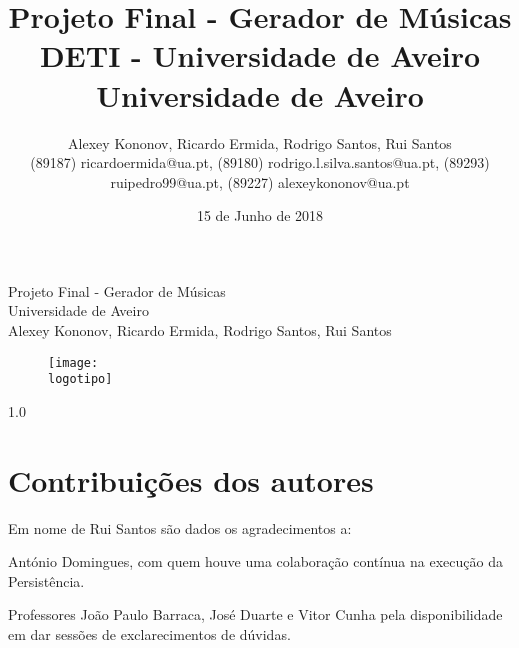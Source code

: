 \documentclass[a4paper]{report}
\begin{document}
%
\def\titulo{Projeto Final - Gerador de Músicas}
\def\data{15 de Junho de 2018}
\def\autores{Alexey Kononov, Ricardo Ermida, Rodrigo Santos, Rui Santos}
\def\autorescontactos{(89187) ricardoermida@ua.pt, (89180) rodrigo.l.silva.santos@ua.pt, (89293) ruipedro99@ua.pt, (89227) alexeykononov@ua.pt}
\def\versao{1.0}
\def\departamento{DETI - Universidade de Aveiro}
\def\empresa{Universidade de Aveiro}
\def\logotipo{ua.pdf}
%
%
\begin{titlepage}

\begin{center}
%
\vspace*{50mm}
%
{\Huge \titulo}\\ 
%
\vspace{10mm}
%
{\Large \empresa}\\
%
\vspace{10mm}
%
{\LARGE \autores}\\ 
%
\vspace{30mm}
%
\begin{figure}[h]
\center
\texttt{[image: \\logotipo]}
\end{figure}
%
\vspace{30mm}
\end{center}
%
\begin{flushright}
\versao
\end{flushright}
\end{titlepage}

\title{%
{\Huge\textbf{\titulo}}\\
{\Large \departamento\\ \empresa}
}
%
\author{%
    \autores \\
    \autorescontactos
}
%
\date{\data}
%
\maketitle



\chapter*{Contribuições dos autores}

Em nome de Rui Santos são dados os agradecimentos a:

António Domingues, com quem houve uma colaboração contínua na execução da Persistência.

Professores João Paulo Barraca, José Duarte e Vitor Cunha pela disponibilidade em dar sessões de exclarecimentos de dúvidas.
\end{document}
